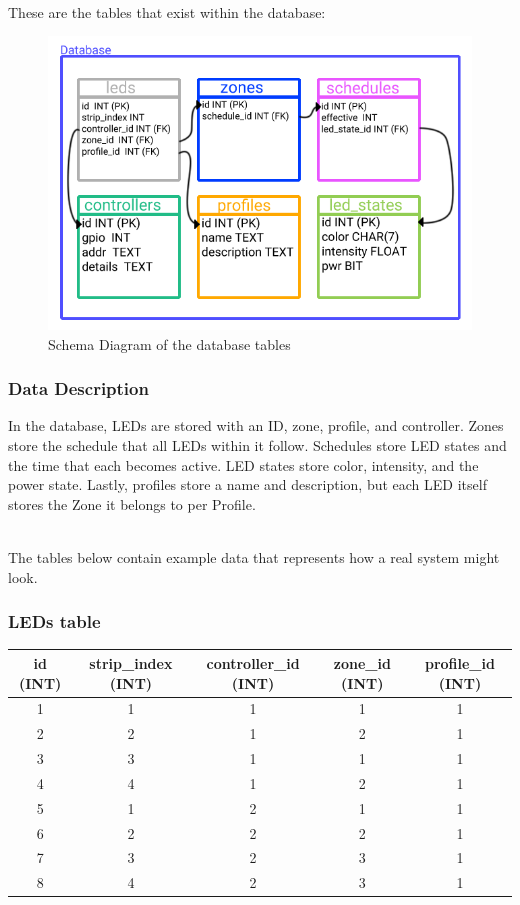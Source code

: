 \documentclass[onecolumn, draftclsnofoot,10pt, compsoc]{IEEEtran}
\begin{document}
			\noindent \\These are the tables that exist within the database:
			\begin{center}
				\begin{figure}[H]
					\includegraphics[width=\linewidth]{systemDiagrams/database.png}
					\caption{Schema Diagram of the database tables}
					\label{fig:databaseDiagram}
				\end{figure}
			\end{center}

			\subsubsection{Data Description}
			In the database, LEDs are stored with an ID, zone, profile, and controller. Zones store the schedule that all LEDs within it follow.
			Schedules store LED states and the time that each becomes active. LED states store color, intensity, and the power state.
			Lastly, profiles store a name and description, but each LED itself stores the Zone it belongs to per Profile.

			\noindent \\The tables below contain example data that represents how a real system might look.

			\subsubsection{LEDs table}
				\begin{tabular}{ |c|c|c|c|c| }
					\hline
					id (INT) & strip\_index (INT) & controller\_id (INT) & zone\_id (INT) & profile\_id (INT) \\
					\hline
					1 & 1 & 1 & 1 & 1 \\
					2 & 2 & 1 & 2 & 1 \\
					3 & 3 & 1 & 1 & 1 \\
					4 & 4 & 1 & 2 & 1 \\
					5 & 1 & 2 & 1 & 1 \\
					6 & 2 & 2 & 2 & 1 \\
					7 & 3 & 2 & 3 & 1 \\
					8 & 4 & 2 & 3 & 1 \\
					\hline
				\end{tabular}
\end{document}
